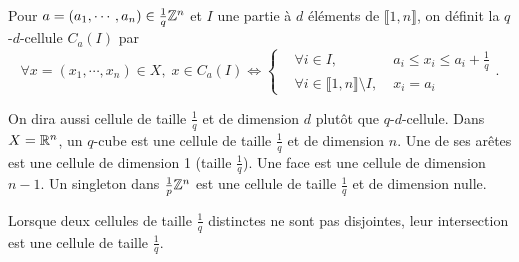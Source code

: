 \begin{defi}[q-d-cellule]
 Pour $a = (a_1, \cdots, a_n) \in \frac{1}{q}\mathbb{Z}^n$ et $I$ une partie à $d$ éléments de $\llbracket 1,n \rrbracket$, on définit la $q$-$d$-cellule $C_a(I)$ par
\begin{displaymath}
 \forall x = (x_1, \cdots, x_n) \in X, \; x \in C_a(I)  \Leftrightarrow
 \left\lbrace
   \begin{aligned}
      &\forall i \in I,&\; a_i \leq x_i \leq a_i + \frac{1}{q} \\
      &\forall i \in \llbracket 1,n \rrbracket \setminus I, &\; x_i = a_i
   \end{aligned}
  \right. .
\end{displaymath}
\end{defi}
\begin{rem}
On dira aussi cellule de taille $\frac{1}{q}$ et de dimension $d$ plutôt que $q$-$d$-cellule.\newline
Dans $X=\mathbb{R}^n$, un $q$-cube est une cellule de taille $\frac{1}{q}$ et de dimension $n$. Une de ses arêtes est une cellule de dimension 1 (taille $\frac{1}{q}$). Une face est une cellule de dimension $n-1$. Un singleton dans $\frac{1}{p} \mathbb{Z}^n$ est une cellule de taille $\frac{1}{q}$ et de dimension nulle.
\end{rem}
\begin{propn}
 Lorsque deux cellules de taille $\frac{1}{q}$ distinctes ne sont pas disjointes, leur intersection est une cellule de taille $\frac{1}{q}$.
\end{propn}
